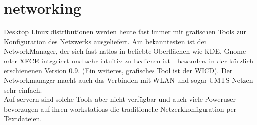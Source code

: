 \section{networking}
Desktop Linux distributionen werden heute fast immer mit grafischen Tools zur Konfiguration des Netzwerks ausgeliefert. Am bekanntesten ist der NetworkManager, der sich fast natlos in beliebte Oberfl\"achen wie KDE, Gnome oder XFCE integriert und sehr intuitiv zu bedienen ist - besonders in der k\"urzlich erschienenen Version 0.9. (Ein weiteres, grafisches Tool ist der WICD). Der Networkmanager macht auch das Verbinden mit WLAN und sogar UMTS Netzen sehr einfach.\\
Auf servern sind solche Tools aber nicht verf\"ugbar und auch viele Poweruser bevorzugen auf ihren workstations die traditionelle Netzerkkonfiguration per Textdateien.\\
